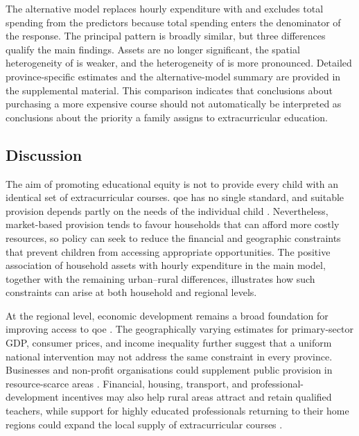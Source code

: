 \documentclass[times]{interact}
\theoremstyle{plain}%
\theoremstyle{definition}
\theoremstyle{remark}
\begin{document}
The alternative model replaces hourly expenditure with \QOESpendRatio and excludes total spending from the predictors because total spending enters the denominator of the response.
The principal pattern is broadly similar, but three differences qualify the main findings.
Assets are no longer significant, the spatial heterogeneity of \CPI is weaker, and the heterogeneity of \Engel is more pronounced.
Detailed province-specific estimates and the alternative-model summary are provided in the supplemental material.
This comparison indicates that conclusions about purchasing a more expensive course should not automatically be interpreted as conclusions about the priority a family assigns to extracurricular education.

\subsection{Discussion} \label{sec:discussion}

The aim of promoting educational equity is not to provide every child with an identical set of extracurricular courses.
\Gls{qoe} has no single standard, and suitable provision depends partly on the needs of the individual child \citep{Li-2019-en}.
Nevertheless, market-based provision tends to favour households that can afford more costly resources, so policy can seek to reduce the financial and geographic constraints that prevent children from accessing appropriate opportunities.
The positive association of household assets with hourly expenditure in the main model, together with the remaining urban--rural differences, illustrates how such constraints can arise at both household and regional levels.

At the regional level, economic development remains a broad foundation for improving access to \gls{qoe} \citep{XiaoLiu-2014}.
The geographically varying estimates for primary-sector GDP, consumer prices, and income inequality further suggest that a uniform national intervention may not address the same constraint in every province.
Businesses and non-profit organisations could supplement public provision in resource-scarce areas \citep{JingboNatalie-2020,Zhou-2015}.
Financial, housing, transport, and professional-development incentives may also help rural areas attract and retain qualified teachers, while support for highly educated professionals returning to their home regions could expand the local supply of extracurricular courses \citep{ChengDai-2023,LiShi-2020,JiangYip-2024,ZhangDong-2023,WangTigelaar-2019}.
\end{document}
